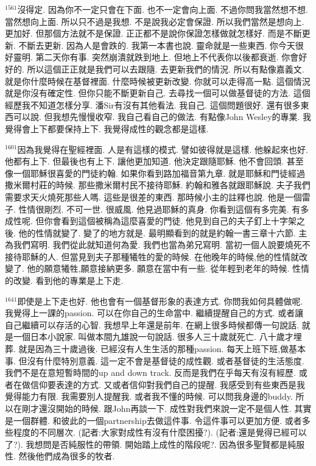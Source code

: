 \documentclass{book}
\begin{document}
$^{1561}$沒得定.
因為你不一定只會在下面.
也不一定會向上面.
不過你問我當然想不想.
當然想向上面.
所以只不過是我想.
不是說我必定會保證.
所以我們當然是想向上.
更加好.
但那個方法就不是保證.
正正都不是說你保證怎樣做就怎樣好.
而是不斷更新.
不斷去更新.
因為人是會跌的.
我第一本書也說.
靈命就是一些東西.
你今天很好靈明.
第二天你有事.
突然崩潰就跌到地上.
但地上不代表你以後都衰逝.
你會好好的.
所以這個正正就是我們可以去跟隨.
去更新我們的情況.
所以有點像嘉義文.
就是你什麼時候在基督裡面.
什麼時候被更新改變.
你就可以走得高一點.
這個情況就是你沒有確定性.
但你只能不斷更新自己.
去尋找一個可以做基督徒的方法.
這個經歷我不知道怎樣分享.
潘Sir有沒有其他看法.
我自己.
這個問題很好.
還有很多東西可以說.
但我想先慢慢收窄.
我自己看自己的做法.
有點像John Wesley的專業.
我覺得會上下都要保持上下.
我覺得成性的觀念都是這樣.

$^{1601}$因為我覺得在聖經裡面.
人是有這樣的模式.
譬如彼得就是這樣.
他躲起來也好.
他都有上下.
但最後也有上下.
讓他更加知道.
他決定跟隨耶穌.
他不會回頭.
甚至像一個耶穌很喜愛的門徒約翰.
如果你看到路加福音第九章.
就是耶穌和門徒經過撒米爾村莊的時候.
那些撒米爾村民不接待耶穌.
約翰和雅各就跟耶穌說.
夫子我們需要求天火燒死那些人嗎.
這些是很差的東西.
那時候小主的註釋也說.
他是一個雷子.
性情很剛烈.
不可一世.
很威風.
他見過耶穌的真身.
你看到這個有多完美.
有多成性呢.
但你會看到這個被稱為這麼喜愛的門徒.
他見到自己的夫子釘上十字架之後.
他的性情就變了.
變了的地方就是.
最明顯看到的就是約翰一書三章十六節.
主為我們寫明.
我們從此就知道何為愛.
我們也當為弟兄寫明.
當初一個人說要燒死不接待耶穌的人.
但當見到夫子那種犧牲的愛的時候.
在他晚年的時候,他的性情就改變了.
他的願意犧牲,願意接納更多.
願意在當中有一些.
從年輕到老年的時候.
性情的改變.
看到他的專業是上下走.

$^{1641}$即使是上下走也好.
他也會有一個基督形象的表達方式.
你問我如何具體做呢.
我覺得上一課的passion.
可以在你自己的生命當中.
繼續提醒自己的方式.
或者讓自己繼續可以存活的心智.
我想早上年還是前年.
在網上很多時候都傳一句說話.
就是一個日本小說家.
叫做本間九雄說一句說話.
很多人三十歲就死亡.
八十歲才埋葬.
就是因為三十歲過後.
已經沒有人生生活的那種passion.
每天上班下班,做基本事.
但沒有什麼特別意義.
這一定不會是基督徒的成性觀.
或者基督徒的生活態度.
我們不是在意短暫時間的up and down track.
反而是我們在乎每天有沒有經歷.
或者在做信仰要表達的方式.
又或者信仰對我們自己的提醒.
我感受到有些東西是我覺得能力有限.
我需要別人提醒我.
或者我不懂的時候.
可以問我身邊的buddy.
所以在剛才還沒開始的時候.
跟John再談一下.
成性對我們來說一定不是個人性.
其實是一個群體.
和彼此的一個partnership去做這件事.
令這件事可以更加方便.
或者多些程度的不同層次.
(記者:大家對成性有沒有什麼困擾?).
(記者:還是覺得已經可以了?).
我想問是否純服性的帶領.
開始踏上成性的階段呢?.
因為很多聖賢都是純服性.
然後他們成為很多的牧者.
\end{document}
